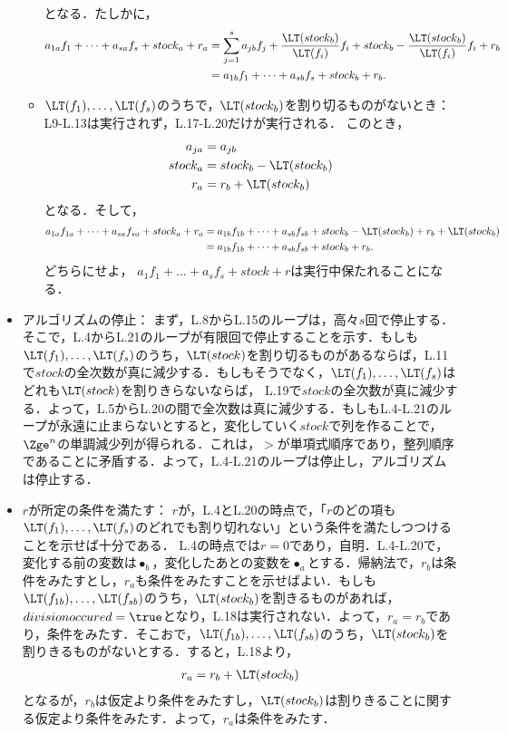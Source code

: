 \begin{myproof}
\begin{itemize}
\begin{itemize}
となる．たしかに，
\begin{align}
 a_{1a}f_1 + \dots + a_{sa}f_s + stock_a + r_a
&=
\sum_{j=1}^s a_{jb}  f_j + \frac{\LT(stock_b)}{\LT(f_i)}f_i + stock_b - \frac{\LT(stock_b)}{\LT(f_i)}f_i + r_b\\
 & =
a_{1b}f_1 + \dots + a_{sb}f_s + stock_b + r_b.
\end{align}
 \item $\LT(f_1),\dots,\LT(f_s)$のうちで，$\LT(stock_b)$を割り切るものがないとき：L9-L.13は実行されず，L.17-L.20だけが実行される．
このとき，
\begin{align}
 a_{ja} &= a_{jb}\\
 stock_a & = stock_b - \LT(stock_b)\\
 r_a & = r_b + \LT(stock_b)
\end{align}
となる．そして，
\begin{align}
 a_{1a} f_{1a} + \dots + a_{sa} f_{sa} + stock_a + r_a
&=
a_{1b} f_{1b} + \dots + a_{sb} f_{sb} + stock_b - \LT(stock_b) + r_b + \LT(stock_b)\\
 & =
a_{1b}f_{1b} + \dots + a_{sb} f_{sb} + stock_b + r_b.
\end{align}
どちらにせよ，
$a_1 f_1 + \dots + a_s f_s + stock + r$は実行中保たれることになる．
\end{itemize}
  \item アルゴリズムの停止：
まず，L.8からL.15のループは，高々$s$回で停止する．そこで，L.4からL.21のループが有限回で停止することを示す．もしも$\LT(f_1),\dots,\LT(f_s)$のうち，$\LT(stock)$を割り切るものがあるならば，L.11で$stock$の全次数が真に減少する．もしもそうでなく，$\LT(f_1),\dots,\LT(f_s)$はどれも$\LT(stock)$を割りきらないならば，
L.19で$stock$の全次数が真に減少する．よって，L.5からL.20の間で全次数は真に減少する．もしもL.4-L.21のループが永遠に止まらないとすると，変化していく$stock$で列を作ることで，$\Zge^n$の単調減少列が得られる．これは，$>$が単項式順序であり，整列順序であることに矛盾する．よって，L.4-L.21のループは停止し，アルゴリズムは停止する．
  \item $r$が所定の条件を満たす：
$r$が，L.4とL.20の時点で，「$r$のどの項も$\LT(f_1),\dots,\LT(f_s)$のどれでも割り切れない」という条件を満たしつつけることを示せば十分である．
L.4の時点では$r=0$であり，自明．L.4-L.20で，変化する前の変数は$\bullet_b$，変化したあとの変数を$\bullet_a$とする．帰納法で，$r_b$は条件をみたすとし，$r_a$も条件をみたすことを示せばよい．もしも$\LT(f_{1b}),\dots,\LT(f_{sb})$のうち，$\LT(stock_b)$を割きるものがあれば，$divisionoccured = \true$となり，L.18は実行されない．よって，$r_a = r_b$であり，条件をみたす．そこおで，$\LT(f_{1b}),\dots,\LT(f_{sb})$のうち，$\LT(stock_b)$を割りきるものがないとする．すると，L.18より，
\begin{align}
 r_a = r_b + \LT(stock_b)
\end{align}
となるが，$r_b$は仮定より条件をみたすし，$\LT(stock_b)$は割りきることに関する仮定より条件をみたす．よって，$r_a$は条件をみたす．


\end{itemize}
\end{myproof}
